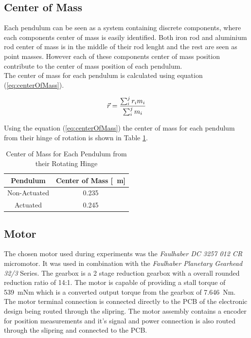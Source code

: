\subsection{Center of Mass}
Each pendulum can be seen as a system containing discrete components, where each components center of mass is easily identified. Both iron rod and aluminium rod center of mass is in the middle of their rod lenght and the rest are seen as point masses. However each of these components center of mass position contribute to the center of mass position of each pendulum.\\

The center of mass for each pendulum is calculated using equation (\ref{eq:centerOfMass}).

\begin{equation} \label{eq:centerOfMass}
\vec{\boldmath{r}} = \frac{\sum_{i}^{j}r_{i}m_{i}}{\sum_{i}^{j}m_{i}}
\end{equation}

Using the equation (\ref{eq:centerOfMass}) the center of mass for each pendulum from their hinge of rotation is shown in Table \ref{table:centerOfMass}.

\begin{table}[]
	\centering
	\begin{tabular}{|c|c|}
		\hline
		Pendulum & Center of Mass [\SI{}{m}] \\
		\hline
		\hline
		Non-Actuated  & \SI{0.235}{} \\
		\hline
		Actuated  & \SI{0.245}{} \\
		\hline
	\end{tabular}
	\caption{Center of Mass for Each Pendulum from their Rotating Hinge}
	\label{table:centerOfMass}
\end{table}


\subsection{Motor}
The chosen motor used during experiments was the \textit{Faulhaber DC 3257 012 CR} micromotor. It was used in combination with the \textit{Faulhaber Planetary Gearhead 32/3} Series. The gearbox is a 2 stage reduction gearbox with a overall rounded reduction ratio of 14:1. The motor is capable of providing a stall torque of \SI{539}{mNm} which is a converted output torque from the gearbox of \SI{7.646}{Nm}.\\

The motor terminal connection is connected directly to the PCB of the electronic design being routed through the slipring. The motor assembly contains a encoder for position measurements and it's signal and power connection is also routed through the slipring and connected to the PCB.
